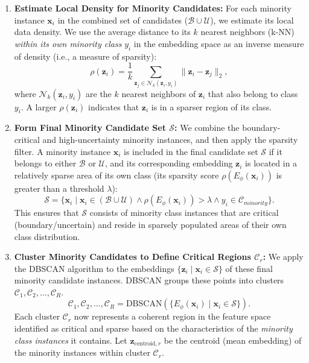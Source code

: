 \documentclass{article}
\begin{document}
\begin{enumerate}
    \item \textbf{Estimate Local Density for Minority Candidates:} For each minority instance $\mathbf{x}_i$ in the combined set of candidates ($\mathcal{B} \cup \mathcal{U}$), we estimate its local data density. We use the average distance to its $k$ nearest neighbors (k-NN) \textit{within its own minority class} $y_i$ in the embedding space as an inverse measure of density (i.e., a measure of sparsity):
    \begin{equation}
    \rho(\mathbf{z}_i) = \frac{1}{k} \sum_{\mathbf{z}_j \in \mathcal{N}_k(\mathbf{z}_i, y_i)} \|\mathbf{z}_i - \mathbf{z}_j\|_2,
    \end{equation}
    where $\mathcal{N}_k(\mathbf{z}_i, y_i)$ are the $k$ nearest neighbors of $\mathbf{z}_i$ that also belong to class $y_i$. A larger $\rho(\mathbf{z}_i)$ indicates that $\mathbf{z}_i$ is in a sparser region of its class.

    \item \textbf{Form Final Minority Candidate Set $\mathcal{S}$:} We combine the boundary-critical and high-uncertainty minority instances, and then apply the sparsity filter. A minority instance $\mathbf{x}_i$ is included in the final candidate set $\mathcal{S}$ if it belongs to either $\mathcal{B}$ or $\mathcal{U}$, and its corresponding embedding $\mathbf{z}_i$ is located in a relatively sparse area of its own class (its sparsity score $\rho(E_\phi(\mathbf{x}_i))$ is greater than a threshold $\lambda$):
    \begin{equation}
    \mathcal{S} = \{\mathbf{x}_i \mid \mathbf{x}_i \in (\mathcal{B} \cup \mathcal{U}) \land \rho(E_\phi(\mathbf{x}_i)) > \lambda \land y_i \in \mathcal{C}_{minority}\}.
    \end{equation}
    This ensures that $\mathcal{S}$ consists of minority class instances that are critical (boundary/uncertain) and reside in sparsely populated areas of their own class distribution.

    \item \textbf{Cluster Minority Candidates to Define Critical Regions $\mathcal{C}_r$:} We apply the DBSCAN algorithm to the embeddings $\{\mathbf{z}_i \mid \mathbf{x}_i \in \mathcal{S}\}$ of these final minority candidate instances. DBSCAN groups these points into clusters $\mathcal{C}_1, \mathcal{C}_2, \ldots, \mathcal{C}_R$.
    \begin{equation}
    \mathcal{C}_1, \mathcal{C}_2, \ldots, \mathcal{C}_R = \text{DBSCAN}(\{E_\phi(\mathbf{x}_i) \mid \mathbf{x}_i \in \mathcal{S}\}).
    \end{equation}
    Each cluster $\mathcal{C}_r$ now represents a coherent region in the feature space identified as critical and sparse based on the characteristics of the \textit{minority class instances} it contains. Let $\mathbf{z}_{\text{centroid},r}$ be the centroid (mean embedding) of the minority instances within cluster $\mathcal{C}_r$.


\end{enumerate}
\end{document}

